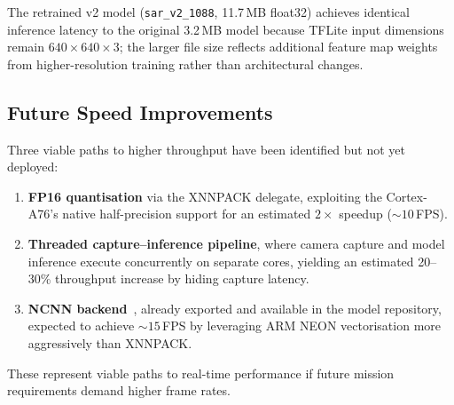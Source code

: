 The retrained v2 model (\texttt{sar\_v2\_1088}, 11.7\,MB float32) achieves identical inference latency to the original 3.2\,MB model because TFLite input dimensions remain $640 \times 640 \times 3$; the larger file size reflects additional feature map weights from higher-resolution training rather than architectural changes.

\subsection{Future Speed Improvements}\label{sec:cv:future}

Three viable paths to higher throughput have been identified but not yet deployed:
\begin{enumerate}
    \item \textbf{FP16 quantisation} via the XNNPACK delegate, exploiting the Cortex-A76's native half-precision support for an estimated $2\times$ speedup (${\sim}10$\,FPS).
    \item \textbf{Threaded capture--inference pipeline}, where camera capture and model inference execute concurrently on separate cores, yielding an estimated 20--30\% throughput increase by hiding capture latency.
    \item \textbf{NCNN backend}~\cite{ncnn}, already exported and available in the model repository, expected to achieve ${\sim}15$\,FPS by leveraging ARM NEON vectorisation more aggressively than XNNPACK.
\end{enumerate}
These represent viable paths to real-time performance if future mission requirements demand higher frame rates.
